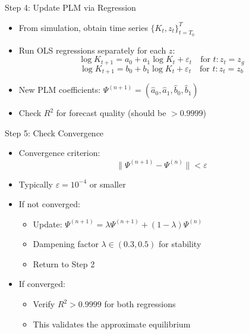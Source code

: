 \documentclass[aspectratio=169]{beamer}
\newcommand{\1}{\mathbf{1}}
\begin{document}
\begin{frame}{Step 4: Update PLM via Regression}
  \begin{itemize}
      \item From simulation, obtain time series $\{K_t, z_t\}_{t=T_0}^{T}$
      \item Run OLS regressions separately for each $z$:
      \[
      \log K_{t+1} = a_0 + a_1 \log K_t + \varepsilon_t \quad \text{for } t : z_t = z_g
      \]
      \[
      \log K_{t+1} = b_0 + b_1 \log K_t + \varepsilon_t \quad \text{for } t : z_t = z_b
      \]
      \item New PLM coefficients: $\Psi^{(n+1)} = (\hat{a}_0, \hat{a}_1, \hat{b}_0, \hat{b}_1)$
      \item Check $R^2$ for forecast quality (should be $> 0.9999$)
  \end{itemize}
\end{frame}

\begin{frame}{Step 5: Check Convergence}
  \begin{itemize}
      \item Convergence criterion:
      \[
      \|\Psi^{(n+1)} - \Psi^{(n)}\| < \varepsilon
      \]
      \item Typically $\varepsilon = 10^{-4}$ or smaller
      \item If not converged:
      \begin{itemize}
          \item Update: $\Psi^{(n+1)} = \lambda \Psi^{(n+1)} + (1-\lambda) \Psi^{(n)}$
          \item Dampening factor $\lambda \in (0.3, 0.5)$ for stability
          \item Return to Step 2
      \end{itemize}
      \item If converged:
      \begin{itemize}
          \item Verify $R^2 > 0.9999$ for both regressions
          \item This validates the approximate equilibrium
      \end{itemize}
  \end{itemize}
\end{frame}
\end{document}
